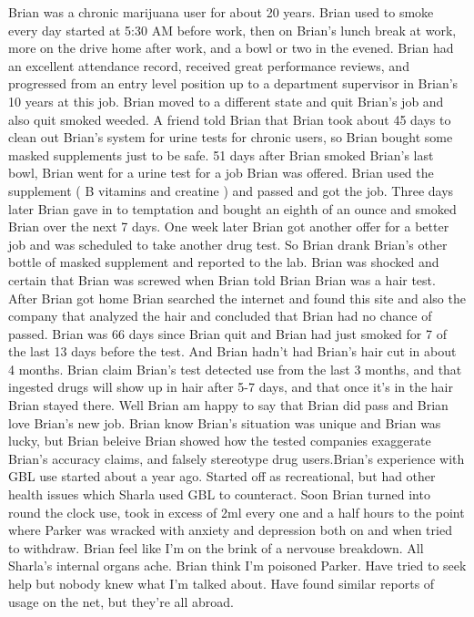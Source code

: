 \documentclass[12pt]{book}
\begin{document}
Brian was a chronic marijuana user for about 20 years. Brian used to smoke every day started at 5:30 AM before work, then on Brian's lunch break at work, more on the drive home after work, and a bowl or two in the evened. Brian had an excellent attendance record, received great performance reviews, and progressed from an entry level position up to a department supervisor in Brian's 10 years at this job. Brian moved to a different state and quit Brian's job and also quit smoked weeded. A friend told Brian that Brian took about 45 days to clean out Brian's system for urine tests for chronic users, so Brian bought some masked supplements just to be safe. 51 days after Brian smoked Brian's last bowl, Brian went for a urine test for a job Brian was offered. Brian used the supplement ( B vitamins and creatine ) and passed and got the job. Three days later Brian gave in to temptation and bought an eighth of an ounce and smoked Brian over the next 7 days. One week later Brian got another offer for a better job and was scheduled to take another drug test. So Brian drank Brian's other bottle of masked supplement and reported to the lab. Brian was shocked and certain that Brian was screwed when Brian told Brian Brian was a hair test. After Brian got home Brian searched the internet and found this site and also the company that analyzed the hair and concluded that Brian had no chance of passed. Brian was 66 days since Brian quit and Brian had just smoked for 7 of the last 13 days before the test. And Brian hadn't had Brian's hair cut in about 4 months. Brian claim Brian's test detected use from the last 3 months, and that ingested drugs will show up in hair after 5-7 days, and that once it's in the hair Brian stayed there. Well Brian am happy to say that Brian did pass and Brian love Brian's new job. Brian know Brian's situation was unique and Brian was lucky, but Brian beleive Brian showed how the tested companies exaggerate Brian's accuracy claims, and falsely stereotype drug users.Brian's experience with GBL use started about a year ago. Started off as recreational, but had other health issues which Sharla used GBL to counteract. Soon Brian turned into round the clock use, took in excess of 2ml every one and a half hours to the point where Parker was wracked with anxiety and depression both on and when tried to withdraw. Brian feel like I'm on the brink of a nervouse breakdown. All Sharla's internal organs ache. Brian think I'm poisoned Parker. Have tried to seek help but nobody knew what I'm talked about. Have found similar reports of usage on the net, but they're all abroad.
\end{document}
